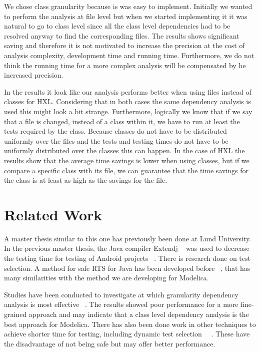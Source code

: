 \documentclass{cslthse-msc}
\begin{document}
We chose class granularity because is was easy to implement. Initially we wanted to perform the analysis at file level but when we started implementing it it was natural to go to class level since all the class level dependencies had to be resolved anyway to find the corresponding files. The results shows significant saving and therefore it is not motivated to increase the precision at the cost of analysis complexity, development time and running time. Furthermore, we do not think the running time for a more complex analysis will be compensated by he increased precision.

In the results it look like our analysis performs better when using files instead of classes for HXL. Considering that in both cases the same dependency analysis is used this might look a bit strange. Furthermore, logically we know that if we say that a file is changed, instead of a class within it, we have to run at least the tests required by the class. Because classes do not have to be distributed uniformly over the files and the tests and testing times do not have to be uniformly distributed over the classes this can happen. In the case of HXL the results show that the average time savings is lower when using classes, but if we compare a specific class with its file, we can guarantee that the time savings for the class is at least as high as the savings for the file.

\section{Related Work}
A master thesis similar to this one has previously been done at Lund University. In the previous master thesis, the Java compiler Extendj ~\cite{DBLP:conf/oopsla/EkmanH07} was used to decrease the testing time for testing of Android projects ~\cite{kampe2012dependroid}. There is research done on test selection. A method for safe RTS for Java has been developed before ~\cite{DBLP:conf/pppj/OqvistHM16}, that has many similarities with the method we are developing for Modelica. 

Studies have been conducted to investigate at which granularity dependency analysis is most effective ~\cite{DBLP:conf/sigsoft/LegunsenHSLZM16}. The results showed poor performance for a more fine-grained approach and may indicate that a class level dependency analysis is the best approach for Modelica. There has also been done work in other techniques to achieve shorter time for testing, including dynamic test selection ~\cite{DBLP:journals/tse/RothermelH96}~\cite{DBLP:conf/issta/GligoricEM15}. These have the disadvantage of not being safe but may offer better performance. 
\end{document}
